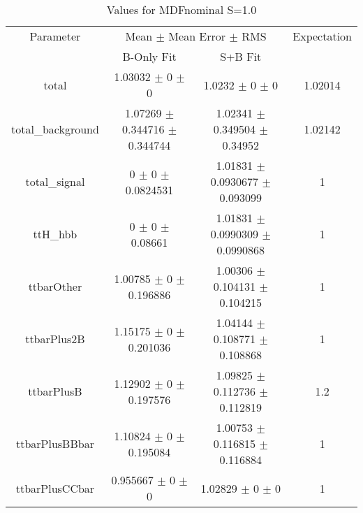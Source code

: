 \begin{table}
\centering
\caption{Values for MDFnominal S=1.0}
\begin{tabular}{cccc}
\toprule
Parameter & \multicolumn{2}{c}{Mean $\pm$ Mean Error $\pm$ RMS} & Expectation\\
 & B-Only Fit & S+B Fit & \\
\midrule
total & \num{1.03032} $\pm$ \num{0} $\pm$ \num{0} & \num{1.0232} $\pm$ \num{0} $\pm$ \num{0} & \num{1.02014}\\
total\_background & \num{1.07269} $\pm$ \num{0.344716} $\pm$ \num{0.344744} & \num{1.02341} $\pm$ \num{0.349504} $\pm$ \num{0.34952} & \num{1.02142}\\
total\_signal & \num{0} $\pm$ \num{0} $\pm$ \num{0.0824531} & \num{1.01831} $\pm$ \num{0.0930677} $\pm$ \num{0.093099} & \num{1}\\
ttH\_hbb & \num{0} $\pm$ \num{0} $\pm$ \num{0.08661} & \num{1.01831} $\pm$ \num{0.0990309} $\pm$ \num{0.0990868} & \num{1}\\
ttbarOther & \num{1.00785} $\pm$ \num{0} $\pm$ \num{0.196886} & \num{1.00306} $\pm$ \num{0.104131} $\pm$ \num{0.104215} & \num{1}\\
ttbarPlus2B & \num{1.15175} $\pm$ \num{0} $\pm$ \num{0.201036} & \num{1.04144} $\pm$ \num{0.108771} $\pm$ \num{0.108868} & \num{1}\\
ttbarPlusB & \num{1.12902} $\pm$ \num{0} $\pm$ \num{0.197576} & \num{1.09825} $\pm$ \num{0.112736} $\pm$ \num{0.112819} & \num{1.2}\\
ttbarPlusBBbar & \num{1.10824} $\pm$ \num{0} $\pm$ \num{0.195084} & \num{1.00753} $\pm$ \num{0.116815} $\pm$ \num{0.116884} & \num{1}\\
ttbarPlusCCbar & \num{0.955667} $\pm$ \num{0} $\pm$ \num{0} & \num{1.02829} $\pm$ \num{0} $\pm$ \num{0} & \num{1}\\
\bottomrule
\end{tabular}
\end{table}